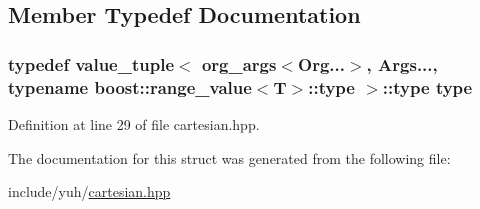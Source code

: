\subsection{\-Member \-Typedef \-Documentation}
\hypertarget{structyuh_1_1detail_1_1value__tuple_3_01org__args_3_01T_00_01Org_8_8_8_4_00_01Args_8_8_8_4_a8d31cab27b15186bf2b260a5c85cb7f5}{
\subsubsection[{type}]{\setlength{\rightskip}{0pt plus 5cm}typedef {\bf value\-\_\-tuple}$<$ {\bf org\-\_\-args}$<$\-Org...$>$, \-Args..., typename boost\-::range\-\_\-value$<$\-T$>$\-::{\bf type} $>$\-::{\bf type} {\bf type}}}\label{d2/d1d/structyuh_1_1detail_1_1value__tuple_3_01org__args_3_01T_00_01Org_8_8_8_4_00_01Args_8_8_8_4_a8d31cab27b15186bf2b260a5c85cb7f5}


\-Definition at line 29 of file cartesian.\-hpp.



\-The documentation for this struct was generated from the following file\-:\begin{DoxyCompactItemize}
\item 
include/yuh/\hyperlink{cartesian_8hpp}{cartesian.\-hpp}\end{DoxyCompactItemize}
